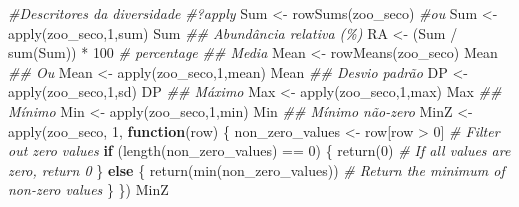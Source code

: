 \documentclass[
  letterpaper,
  DIV=11,
  numbers=noendperiod]{scrartcl}
\newenvironment{Shaded}{}{}
\newcommand{\CommentTok}[1]{\textcolor[rgb]{0.38,0.63,0.69}{\textit{#1}}}
\newcommand{\ControlFlowTok}[1]{\textcolor[rgb]{0.00,0.44,0.13}{\textbf{#1}}}
\newcommand{\DecValTok}[1]{\textcolor[rgb]{0.25,0.63,0.44}{#1}}
\newcommand{\DocumentationTok}[1]{\textcolor[rgb]{0.73,0.13,0.13}{\textit{#1}}}
\newcommand{\FunctionTok}[1]{\textcolor[rgb]{0.02,0.16,0.49}{#1}}
\newcommand{\NormalTok}[1]{#1}
\newcommand{\OtherTok}[1]{\textcolor[rgb]{0.00,0.44,0.13}{#1}}
\newcommand{\SpecialCharTok}[1]{\textcolor[rgb]{0.25,0.44,0.63}{#1}}
\begin{document}
\begin{Shaded}
\begin{Highlighting}[numbers=left,,]
\CommentTok{\#Descritores da diversidade}
\CommentTok{\#?apply}
\NormalTok{Sum }\OtherTok{\textless{}{-}} \FunctionTok{rowSums}\NormalTok{(zoo\_seco)}
\CommentTok{\#ou}
\NormalTok{Sum }\OtherTok{\textless{}{-}} \FunctionTok{apply}\NormalTok{(zoo\_seco,}\DecValTok{1}\NormalTok{,sum)}
\NormalTok{Sum}
\DocumentationTok{\#\# Abundância relativa (\%)}
\NormalTok{RA }\OtherTok{\textless{}{-}}\NormalTok{ (Sum }\SpecialCharTok{/} \FunctionTok{sum}\NormalTok{(Sum)) }\SpecialCharTok{*} \DecValTok{100} \CommentTok{\# percentage}
\DocumentationTok{\#\# Media}
\NormalTok{Mean }\OtherTok{\textless{}{-}} \FunctionTok{rowMeans}\NormalTok{(zoo\_seco)}
\NormalTok{Mean}
\DocumentationTok{\#\# Ou}
\NormalTok{Mean }\OtherTok{\textless{}{-}} \FunctionTok{apply}\NormalTok{(zoo\_seco,}\DecValTok{1}\NormalTok{,mean)}
\NormalTok{Mean}
\DocumentationTok{\#\# Desvio padrão}
\NormalTok{DP }\OtherTok{\textless{}{-}} \FunctionTok{apply}\NormalTok{(zoo\_seco,}\DecValTok{1}\NormalTok{,sd)}
\NormalTok{DP}
\DocumentationTok{\#\# Máximo}
\NormalTok{Max }\OtherTok{\textless{}{-}} \FunctionTok{apply}\NormalTok{(zoo\_seco,}\DecValTok{1}\NormalTok{,max)}
\NormalTok{Max }
\DocumentationTok{\#\# Mínimo}
\NormalTok{Min }\OtherTok{\textless{}{-}} \FunctionTok{apply}\NormalTok{(zoo\_seco,}\DecValTok{1}\NormalTok{,min)}
\NormalTok{Min}
\DocumentationTok{\#\# Mínimo não{-}zero}
\NormalTok{MinZ }\OtherTok{\textless{}{-}} \FunctionTok{apply}\NormalTok{(zoo\_seco, }\DecValTok{1}\NormalTok{, }\ControlFlowTok{function}\NormalTok{(row) \{}
\NormalTok{  non\_zero\_values }\OtherTok{\textless{}{-}}\NormalTok{ row[row }\SpecialCharTok{\textgreater{}} \DecValTok{0}\NormalTok{]  }\CommentTok{\# Filter out zero values}
  \ControlFlowTok{if}\NormalTok{ (}\FunctionTok{length}\NormalTok{(non\_zero\_values) }\SpecialCharTok{==} \DecValTok{0}\NormalTok{) \{}
    \FunctionTok{return}\NormalTok{(}\DecValTok{0}\NormalTok{)  }\CommentTok{\# If all values are zero, return 0}
\NormalTok{  \} }\ControlFlowTok{else}\NormalTok{ \{}
    \FunctionTok{return}\NormalTok{(}\FunctionTok{min}\NormalTok{(non\_zero\_values))  }\CommentTok{\# Return the minimum of non{-}zero values}
\NormalTok{  \}}
\NormalTok{\})}
\NormalTok{MinZ}


\end{Highlighting}
\end{Shaded}
\end{document}
